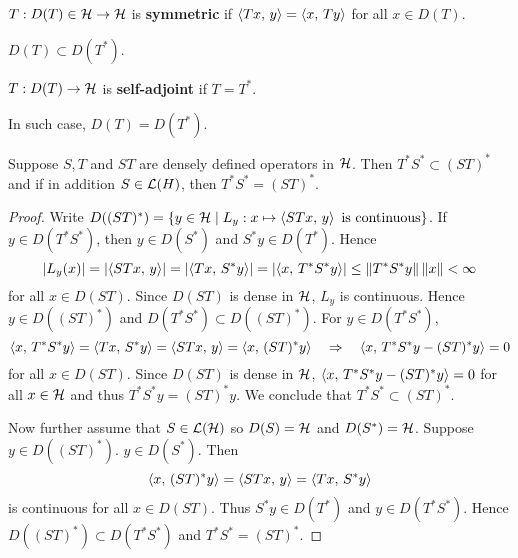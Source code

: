 \begin{definition}
    $T:D(T)\in\mathcal{H}\to\mathcal{H}$ is \textbf{symmetric} if $\left\langle {Tx},\, {y} \right\rangle = \left\langle {x},\, {Ty} \right\rangle$ for all 
    $x\in D(T)$. 
\end{definition}
\begin{remark}
    $D(T)\subset D(T^*)$. 
\end{remark}

\begin{definition}
    $T:D(T)\to\mathcal{H}$ is \textbf{self-adjoint} if $T = T^*$. 
\end{definition}
\begin{remark}
    In such case, $D(T) = D(T^*)$. 
\end{remark}

\begin{proposition}
    Suppose $S,T$ and $ST$ are densely defined operators in $\mathcal{H}$. 
    Then $T^*S^*\subset (ST)^*$ and if in addition $S\in\mathcal{L}(H)$, 
    then $T^*S^* = (ST)^*$.
\end{proposition}
\begin{proof}
    Write $D((ST)^*) = \left\{ y\in\mathcal{H} \;\middle\vert\; L_y: x\mapsto \left\langle {STx},\, {y} \right\rangle\text{ is continuous} \right\}$. 
    If $y\in D(T^*S^*)$, then $y\in D(S^*)$ and $S^*y\in D(T^*)$. Hence 
    \begin{equation*}
        \left\lvert {L_y(x)} \right\rvert = \left\lvert {\left\langle {STx},\, {y} \right\rangle} \right\rvert = \left\lvert {\left\langle {Tx},\, {S^*y} \right\rangle} \right\rvert 
        = \left\lvert {\left\langle {x},\, {T^*S^*y} \right\rangle} \right\rvert \leq \left\lVert {T^*S^*y} \right\rVert\left\lVert {x} \right\rVert < \infty
    \end{equation*}
    for all $x\in D(ST)$. Since $D(ST)$ is dense in $\mathcal{H}$, $L_y$ is continuous. 
    Hence $y\in D((ST)^*)$ and $D(T^*S^*) \subset D((ST)^*)$. For $y\in D(T^*S^*)$, 
    \begin{equation*}
        \left\langle {x},\, {T^*S^*y} \right\rangle = \left\langle {Tx},\, {S^*y} \right\rangle = \left\langle {STx},\, {y} \right\rangle = \left\langle {x},\, {(ST)^*y} \right\rangle 
        \quad\Rightarrow\quad 
        \left\langle {x},\, {T^*S^*y - (ST)^*y} \right\rangle = 0
    \end{equation*} 
    for all $x\in D(ST)$. Since $D(ST)$ is dense in $\mathcal{H}$, $\left\langle {x},\, {T^*S^*y - (ST)^*y} \right\rangle = 0$ 
    for all $x\in\mathcal{H}$ and thus $T^*S^*y = (ST)^*y$. We conclude that 
    $T^*S^* \subset (ST)^*$.

    Now further assume that $S\in\mathcal{L}(\mathcal{H})$ so $D(S) = \mathcal{H}$ and $D(S^*) = \mathcal{H}$. 
    Suppose $y\in D((ST)^*)$. $y\in D(S^*)$. Then
    \begin{equation*}
        \left\langle {x},\, {(ST)^*y} \right\rangle = \left\langle {STx},\, {y} \right\rangle = \left\langle {Tx},\, {S^*y} \right\rangle
    \end{equation*}
    is continuous for all $x\in D(ST)$. Thus $S^*y\in D(T^*)$ and $y\in D(T^*S^*)$.
    Hence $D((ST)^*) \subset D(T^*S^*)$ and $T^*S^* = (ST)^*$.
\end{proof}


